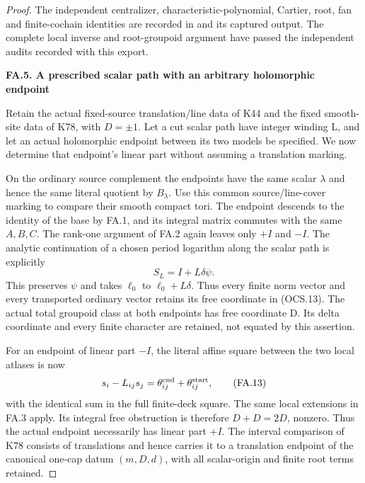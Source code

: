 \begin{proof}
The independent centralizer, characteristic-polynomial, Cartier, root,
fan and finite-cochain identities are recorded in
 and its captured output. The complete local inverse and root-groupoid argument have passed the independent audits recorded with this export.

\par

\medskip\noindent\textbf{FA.5. A prescribed scalar path with an arbitrary holomorphic endpoint}

\par\nobreak

Retain the actual fixed-source translation/line data of K44 and the fixed
smooth-site data of K78, with \(D=\pm1\). Let a cut scalar path have integer
winding L, and let an actual holomorphic endpoint between its two models
be specified. We now determine that endpoint's linear part without
assuming a translation marking.

On the ordinary source complement the endpoints have the same scalar
\(\lambda\) and hence the same literal quotient by \(B_\lambda\). Use this common
source/line-cover marking to compare their smooth compact tori. The
endpoint descends to the identity of the base by FA.1, and its integral
matrix commutes with the same \(A,B,C\). The rank-one argument of FA.2 again
leaves only \(+I\) and \(-I\). The analytic continuation of a chosen period
logarithm along the scalar path is explicitly
\[
                      S_L=I+L\delta\psi.                 \tag{FA.12}
\]
This preserves \(\psi\) and takes \(\ell_0\) to \(\ell_0+L\delta\). Thus every finite
norm vector and every transported ordinary vector retains its free
coordinate in (OCS.13). The actual total groupoid class at both endpoints
has free coordinate D. Its delta coordinate and every finite character
are retained, not equated by this assertion.

For an endpoint of linear part \(-I\), the literal affine square between
the two local atlases is now
\[
                    s_i-L_{ij}s_j
                         =\theta^{\rm end}_{ij}
                             +\theta^{\rm start}_{ij},    \tag{FA.13}
\]
with the identical sum in the full finite-deck square. The same local
extensions in FA.3 apply. Its integral free obstruction is therefore
\(D+D=2D\), nonzero. Thus the actual endpoint necessarily has linear part
\(+I\). The interval comparison of K78 consists of translations and hence
carries it to a translation endpoint of the canonical one-cap datum
\((m,D,d)\), with all scalar-origin and finite root terms retained.


\end{proof}
